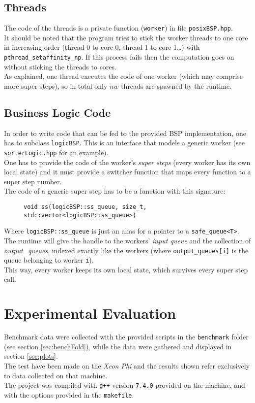 \documentclass[]{article}
\def\code#1{\texttt{#1}}
\begin{document}
\subsection{Threads}
The code of the threads is a private function (\code{worker}) in file \code{posixBSP.hpp}. \\
It should be noted that the program tries to stick the worker threads to one core in increasing order (thread 0 to core 0, thread 1 to core 1\dots) with \code{pthread\_setaffinity\_np}. If this process fails then the computation goes on without sticking the threads to cores. \\
As explained, one thread executes the code of one worker (which may comprise more super steps), so in total only $\mathit{nw}$ threads are spawned by the runtime.


\subsection{Business Logic Code}
\label{sec:business}
In order to write code that can be fed to the provided BSP implementation, one has to subclass \code{logicBSP}. This is an interface that models a generic worker (see \code{sorterLogic.hpp} for an example). \\
One has to provide the code of the worker's \emph{super steps} (every worker has its own local state) and it must provide a switcher function that maps every function to a super step number. \\
The code of a generic super step has to be a function with this signature: 
\begin{figure}[H]
	\centering
	\begin{minipage}{0.9\textwidth}		
		\code{void ss(logicBSP::ss\_queue, size\_t, std::vector<logicBSP::ss\_queue>)}
	\end{minipage}
\end{figure}
Where \code{logicBSP::ss\_queue} is just an alias for a pointer to a \code{safe\_queue<T>}. The runtime will give the handle to the workers' \emph{input queue} and the collection of \emph{output\_queues}, indexed exactly like the workers (where \code{output\_queues[i]} is the queue belonging to worker \code{i}). \\
This way, every worker keeps its own local state, which survives every super step call.

\section{Experimental Evaluation}
\label{sec:eval}
Benchmark data were collected with the provided scripts in the \code{benchmark} folder (see section \ref{sec:benchFold}), while the data were gathered and displayed in section \ref{sec:plots}. \\
The test have been made on the \emph{Xeon Phi} and the results shown refer exclusively to data collected on that machine. \\
The project was compiled with \code{g++} version \code{7.4.0} provided on the machine, and with the options provided in the \code{makefile}.
\end{document}

